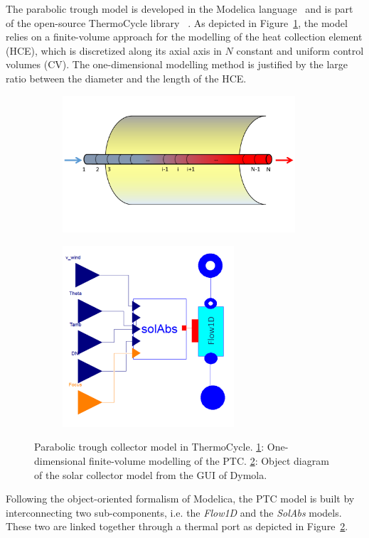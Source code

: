 \documentclass[final,3p,times,review]{elsarticle}
\begin{document}
The parabolic trough model is developed in the Modelica language~\cite{Elmqvist1978} and is part of the open-source ThermoCycle library ~\cite{Quoilin2014a}. As depicted in Figure~\ref{fig:PTC_FV}, the model relies on a finite-volume approach for the modelling of the heat collection element (HCE), which is discretized along its axial axis in $N$ constant and uniform control volumes (CV). The one-dimensional modelling method is justified by the large ratio between the diameter and the length of the HCE. 
%
\begin{figure}[h]
	\centering
	\begin{subfigure}[b]{0.48\textwidth}
		\centering
		\includegraphics[width=0.95\textwidth]{Figures/PTC_FV.pdf}
		\caption{}
		\label{fig:PTC_FV}	
	\end{subfigure}
	\begin{subfigure}[b]{0.48\textwidth}
		\centering
		\includegraphics[width=0.7\textwidth]{Figures/PTC_GUI}
		\caption{}
		\label{fig:PTC_GUI}
	\end{subfigure}
	\caption{Parabolic trough collector model in ThermoCycle. \ref{fig:PTC_FV}: One-dimensional finite-volume modelling of the PTC. \ref{fig:PTC_GUI}: Object diagram of the solar collector model from the GUI of Dymola.}
	\label{fig:PTC_model}
\end{figure}
%
Following the object-oriented formalism of Modelica, the PTC model is built by interconnecting two sub-components, i.e. the \textit{Flow1D} and the \textit{SolAbs} models. These two are linked together through a thermal port as depicted in Figure~\ref{fig:PTC_GUI}.\\
\end{document}
